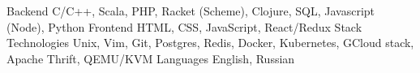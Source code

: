 

\begin{cvskills}

  \cvskill
    {Backend} %
    {C/C++, Scala, PHP, Racket (Scheme), Clojure, SQL, Javascript (Node), Python} %
  \cvskill
    {Frontend} %
    {HTML, CSS, JavaScript, React/Redux Stack} %
\cvskill
  {Technologies} %
  {Unix, Vim, Git, Postgres, Redis, Docker, Kubernetes, GCloud stack, Apache Thrift, QEMU/KVM} %
  \cvskill
    {Languages} %
    {English, Russian} %

\end{cvskills}
